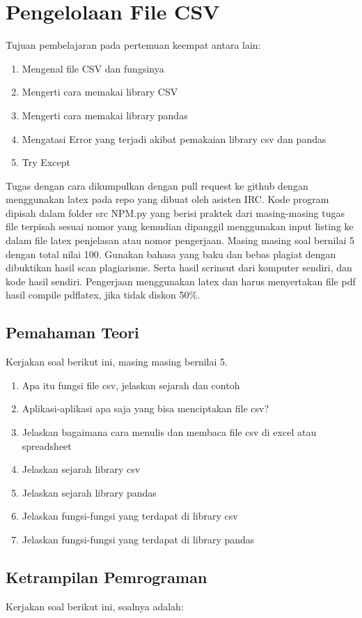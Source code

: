 \chapter{Pengelolaan File CSV}

Tujuan pembelajaran pada pertemuan keempat antara lain:
\begin{enumerate}
\item
Mengenal file CSV dan fungsinya 
\item
Mengerti cara memakai library CSV
\item
Mengerti cara memakai library pandas
\item
Mengatasi Error yang terjadi akibat pemakaian library csv dan pandas
\item
Try Except
\end{enumerate}
Tugas dengan cara dikumpulkan dengan pull request ke github dengan menggunakan latex pada repo yang dibuat oleh asisten IRC. Kode program dipisah dalam folder src NPM.py yang berisi praktek dari masing-masing tugas file terpisah sesuai nomor yang kemudian dipanggil menggunakan input listing ke dalam file latex penjelasan atau nomor pengerjaan. Masing masing soal bernilai 5 dengan total nilai 100. Gunakan bahasa yang baku dan bebas plagiat dengan dibuktikan hasil scan plagiarisme. Serta hasil scrinsut dari komputer sendiri, dan kode hasil sendiri. Pengerjaan menggunakan latex dan harus menyertakan file pdf hasil compile pdflatex, jika tidak diskon 50\%.


\section{Pemahaman Teori}
Kerjakan soal berikut ini, masing masing bernilai 5.
\begin{enumerate}
\item
Apa itu fungsi file csv, jelaskan sejarah dan contoh
\item
Aplikasi-aplikasi apa saja yang bisa menciptakan file csv?
\item
Jelaskan bagaimana cara menulis dan membaca file csv di excel atau spreadsheet
\item
Jelaskan sejarah library csv
\item
Jelaskan sejarah library pandas
\item
Jelaskan fungsi-fungsi yang terdapat di library csv
\item
Jelaskan fungsi-fungsi yang terdapat di library pandas
\end{enumerate}

\section{Ketrampilan Pemrograman}
Kerjakan soal berikut ini, soalnya adalah:

